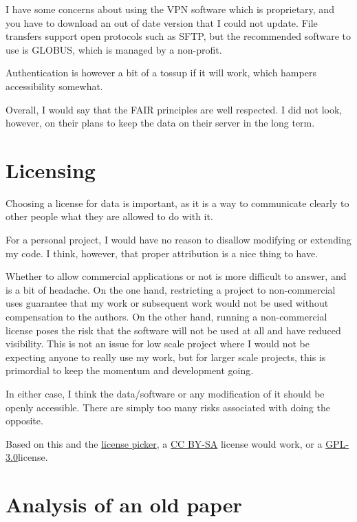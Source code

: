 \documentclass{article}
\begin{document}
I have some concerns about using the VPN software which is proprietary, and you have to download an out of date version that I could not update. File transfers support open protocols such as SFTP, but the recommended software to use is GLOBUS, which is managed by a non-profit. 

Authentication is however a bit of a tossup if it will work, which hampers accessibility somewhat. 

Overall, I would say that the FAIR principles are well respected. I did not look, however, on their plans to keep the data on their server in the long term.

\section{Licensing}

Choosing a license for data is important, as it is a way to communicate clearly to other people what they are allowed to do with it.

For a personal project, I would have no reason to disallow modifying or extending my code. I think, however, that proper attribution is a nice thing to have.

Whether to allow commercial applications or not is more difficult to answer, and is a bit of headache. On the one hand, restricting a project to non-commercial uses guarantee that my work or subsequent work would not be used without compensation to the authors. On the other hand, running a non-commercial license poses the risk that the software will not be used at all and have reduced visibility. This is not an issue for low scale project where I would not be expecting anyone to really use my work, but for larger scale projects, this is primordial to keep the momentum and development going.

In either case, I think the data/software or any modification of it should be openly accessible. There are simply too many risks associated with doing the opposite.

Based on this and the \href{https://ufal.github.io/public-license-selector/}{license picker}, a \href{https://creativecommons.org/licenses/by-sa/4.0/}{CC BY-SA} license would work, or a \href{https://opensource.org/license/GPL-3.0}{GPL-3.0}license. 




\section{Analysis of an old paper}
\end{document}
